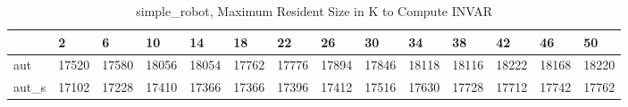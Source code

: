 \begin{table}
\caption{simple_robot, Maximum Resident Size in K to Compute INVAR}
\label{simple_robot_INVAR_size}
\begin{tabular}{llllllllllllll}
\toprule
 & 2 & 6 & 10 & 14 & 18 & 22 & 26 & 30 & 34 & 38 & 42 & 46 & 50 \\
\midrule
aut & 17520 & 17580 & 18056 & 18054 & 17762 & 17776 & 17894 & 17846 & 18118 & 18116 & 18222 & 18168 & 18220 \\
aut_s & 17102 & 17228 & 17410 & 17366 & 17366 & 17396 & 17412 & 17516 & 17630 & 17728 & 17712 & 17742 & 17762 \\
\bottomrule
\end{tabular}
\end{table}
